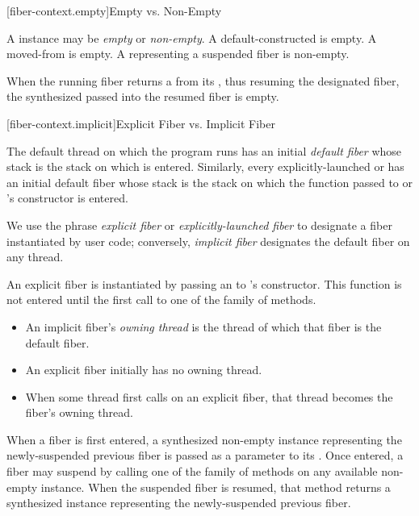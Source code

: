 [fiber-context.empty]{Empty vs. Non-Empty}

A \fiber instance may be \emph{empty} or \emph{non-empty}. A
default-constructed \fiber is empty. A moved-from \fiber is empty. A \fiber
representing a suspended fiber is non-empty.

When the running fiber returns a \fiber from its \entryfn, thus resuming the
designated fiber, the synthesized \fiber passed into the resumed fiber is
empty.

[fiber-context.implicit]{Explicit Fiber vs. Implicit Fiber}

The default thread on which the program runs \main has an
initial \emph{default fiber} whose stack is the stack on which \main is
entered.  Similarly, every explicitly-launched
 or  has an initial default fiber whose
stack is the stack on which the function passed to  or
's constructor is entered.

We use the phrase \emph{explicit fiber} or \emph{explicitly-launched fiber} to
designate a fiber instantiated by user code; conversely, \emph{implicit fiber}
designates the default fiber on any thread.

An explicit fiber is instantiated by passing an \emph{\entryfn} to \fiber's
constructor. This function is not entered until the first call to one of
the  family of methods.

\begin{itemize}
    \item An implicit fiber's \emph{owning thread} is the thread of which that
          fiber is the default fiber.
    \item An explicit fiber initially has no owning thread.
    \item When some thread first calls \anyresume on an explicit fiber, that
          thread becomes the fiber's owning thread.
\end{itemize}

When a fiber is first entered, a synthesized non-empty \fiber instance
representing the newly-suspended previous fiber is passed as a parameter to
its \entryfn. Once entered, a fiber may suspend by calling one of the \resume
family of methods on any available non-empty \fiber instance. When the
suspended fiber is resumed, that method returns a synthesized \fiber instance
representing the newly-suspended previous fiber.

